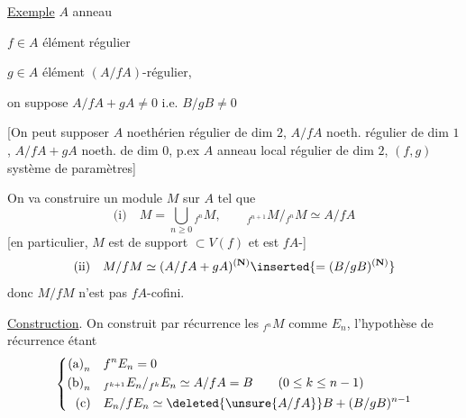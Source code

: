 \uline{Exemple} \quad $A$ anneau 

$f\in A$ élément régulier

$g\in A$ élément $(A/fA)$-régulier, \unsure{\&}

on suppose $A/fA+gA\ne0$ i.e. $B/gB\ne0$

[On peut supposer $A$ noethérien régulier de dim $2$,
$A/fA$ noeth. régulier de dim $1$,
$A/fA+gA$ noeth.  de dim $0$,
p.ex $A$ anneau local régulier de dim $2$,
$(f,g)$ système de paramètres]

On va construire un module $M$ sur $A$ tel que
\[
\text{(i)}\quad M=\bigcup_{n\geq0}{}_{f^n}M,\qquad
{}_{f^{n+1}}M/{}_{f^n}M\simeq A/fA
\]
[en particulier, $M$ est de support $\subset V(f)$ et est
$fA$-]
\[
\text{(ii)}\quad M/fM\simeq(A/fA+gA)^{(\mathbf{N})}\inserted{=(B/gB)^{(\mathbf{N})}}
\]
donc $M/fM$ n'est pas $fA$-cofini.

\uline{Construction}. On construit par récurrence les
${}_{f^n}M$ comme $E_n$, l'hypothèse de
récurrence étant
\[
\left\{\begin{aligned}
\text{(a)}_n\quad & f^nE_n=0\\
\text{(b)}_n\quad & {}_{f^{k+1}}E_n/{}_{f^k}E_n\simeq A/fA=B\qquad(0\leq k\leq n-1)\\
\text{(c)}\quad & E_n/fE_n\simeq\deleted{\unsure{A/fA}}B+(B/gB)^{n-1}
\end{aligned}\right.
\]

